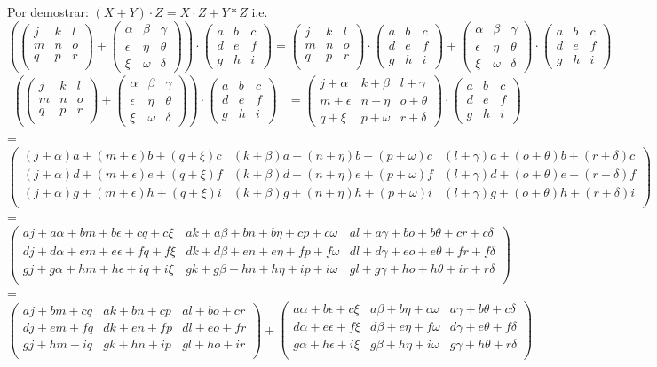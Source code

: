 \documentclass[letterpaper]{article}
\newcommand{\Nmat}{\begin{pmatrix}
		j & k & l\\
		m & n & o\\
		q & p & r\\
\end{pmatrix}}
\newcommand{\Pmat}{\begin{pmatrix}
		\alpha & \beta & \gamma\\
		\epsilon & \eta & \theta\\
		\xi & \omega & \delta
\end{pmatrix}}
\newcommand{\Mmat}{\begin{pmatrix}
		a & b & c\\
		d & e & f\\
		g & h & i
\end{pmatrix}}
\renewcommand{\*}{\cdot}
\theoremstyle{definition}
\begin{document}
Por demostrar: $ (X + Y) \* Z = X\*Z + Y*Z $ i.e. $ \left( \Nmat + \Pmat \right) \* \Mmat = \Nmat \* \Mmat + \Pmat \* \Mmat  $
\begin{align*}
\left( \Nmat + \Pmat \right) \* \Mmat &= \begin{pmatrix}
j + \alpha & k + \beta & l + \gamma\\
m + \epsilon & n + \eta & o + \theta\\
q + \xi & p + \omega & r + \delta
\end{pmatrix}  \* \Mmat
\end{align*}
\centering =
$$
\begin{pmatrix}
(j + \alpha)a + (m + \epsilon)b + (q + \xi)c & (k + \beta)a + (n + \eta)b + (p + \omega)c & (l + \gamma)a + (o + \theta)b + (r + \delta)c\\
(j + \alpha)d + (m + \epsilon)e + (q + \xi)f & (k + \beta)d + (n + \eta)e + (p + \omega)f & (l + \gamma)d + (o + \theta)e + (r + \delta)f\\
(j + \alpha)g + (m + \epsilon)h + (q + \xi)i & (k + \beta)g + (n + \eta)h + (p + \omega)i & (l + \gamma)g + (o + \theta)h + (r + \delta)i\\
\end{pmatrix}
$$
\centering =
$$ 
\begin{pmatrix}
aj + a\alpha + bm + b\epsilon + cq + c\xi & ak + a\beta + bn + b\eta + cp + c\omega & al + a\gamma + bo + b\theta + cr + c\delta\\
dj + d\alpha + em + e\epsilon + fq + f\xi & dk + d\beta + en + e\eta + fp + f\omega & dl + d\gamma + eo + e\theta + fr + f\delta\\
gj + g\alpha + hm + h\epsilon + iq + i\xi & gk + g\beta + hn + h\eta + ip + i\omega & gl + g\gamma + ho + h\theta + ir + r\delta\\
\end{pmatrix}
$$ \centering =
$$
\begin{pmatrix}
aj + bm + cq  & ak + bn + cp  & al + bo + cr \\
dj + em + fq  & dk + en + fp  & dl + eo + fr \\
gj + hm + iq  & gk + hn + ip  & gl + ho + ir \\
\end{pmatrix}
+
\begin{pmatrix}
a\alpha + b\epsilon + c\xi & a\beta + b\eta + c\omega & a\gamma + b\theta + c\delta\\
d\alpha + e\epsilon + f\xi & d\beta + e\eta + f\omega & d\gamma + e\theta + f\delta\\
g\alpha + h\epsilon + i\xi & g\beta + h\eta + i\omega & g\gamma + h\theta + r\delta\\
\end{pmatrix}
$$
\end{document}
